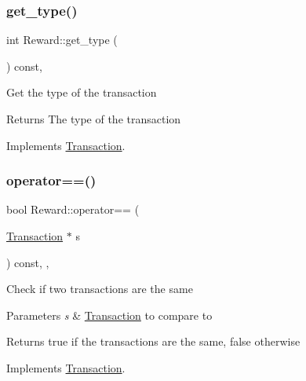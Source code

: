 \subsubsection{\texorpdfstring{get\+\_\+type()}{get\_type()}}
{\footnotesize\ttfamily int Reward\+::get\+\_\+type (\begin{DoxyParamCaption}{ }\end{DoxyParamCaption}) const\hspace{0.3cm}{\ttfamily [final]}, {\ttfamily [virtual]}}

Get the type of the transaction

\begin{DoxyReturn}{Returns}
The type of the transaction 
\end{DoxyReturn}


Implements \mbox{\hyperlink{classTransaction_a4cf9b81505b83a889bab80229f455589}{Transaction}}.

\mbox{\label{classReward_ab2cd65f16c670e3e9d8cfe84a6dc56cb}} 
\subsubsection{\texorpdfstring{operator==()}{operator==()}}
{\footnotesize\ttfamily bool Reward\+::operator== (\begin{DoxyParamCaption}\item[{\mbox{\hyperlink{classTransaction}{Transaction}} $\ast$}]{s }\end{DoxyParamCaption}) const\hspace{0.3cm}{\ttfamily [inline]}, {\ttfamily [final]}, {\ttfamily [virtual]}}

Check if two transactions are the same


\begin{DoxyParams}{Parameters}
{\em s} & \mbox{\hyperlink{classTransaction}{Transaction}} to compare to \\
\hline
\end{DoxyParams}
\begin{DoxyReturn}{Returns}
true if the transactions are the same, false otherwise 
\end{DoxyReturn}


Implements \mbox{\hyperlink{classTransaction_a9a17c97fdcda6791484ad6d07b34470e}{Transaction}}.

\mbox{\label{classReward_a0ecd536148463880f9980fe415b6eb1d}} 
